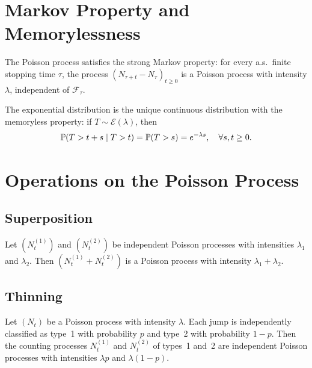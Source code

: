 \section{Markov Property and Memorylessness}

\begin{theorem}
The Poisson process satisfies the strong Markov property: for every a.s.\ finite
stopping time $\tau$, the process $(N_{\tau+t} - N_{\tau})_{t \geq 0}$ is a
Poisson process with intensity $\lambda$, independent of $\mathcal{F}_{\tau}$.
\end{theorem}

\begin{proposition}
The exponential distribution is the unique continuous distribution with the
memoryless property: if $T \sim \mathcal{E}(\lambda)$, then
\[
  \mathbb{P}(T > t + s \mid T > t) = \mathbb{P}(T > s) = e^{-\lambda s}, \quad \forall s, t \geq 0.
\]
\end{proposition}

\section{Operations on the Poisson Process}

\subsection{Superposition}

\begin{theorem}[Superposition]
\label{thm:superposition}
Let $(N_t^{(1)})$ and $(N_t^{(2)})$ be independent Poisson processes with
intensities $\lambda_1$ and $\lambda_2$. Then $(N_t^{(1)} + N_t^{(2)})$ is a
Poisson process with intensity $\lambda_1 + \lambda_2$.
\end{theorem}

\subsection{Thinning}

\begin{theorem}[Thinning]
\label{thm:thinning}
Let $(N_t)$ be a Poisson process with intensity $\lambda$. Each jump is
independently classified as type~1 with probability $p$ and type~2 with
probability $1-p$. Then the counting processes $N_t^{(1)}$ and $N_t^{(2)}$
of types~1 and~2 are independent Poisson processes with intensities $\lambda p$
and $\lambda(1-p)$.
\end{theorem}

